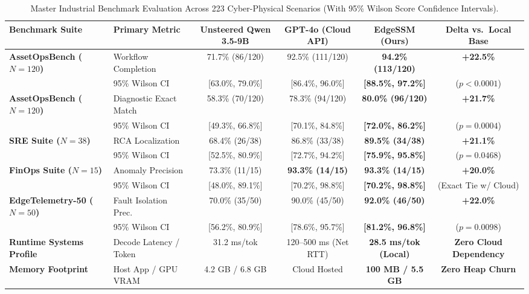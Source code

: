 \documentclass[journal]{IEEEtran}
\begin{document}
\begin{table}[t]
\centering
\caption{Master Industrial Benchmark Evaluation Across 223 Cyber-Physical Scenarios (With 95\% Wilson Score Confidence Intervals).}
\label{tab:master_industrial}
\small
\begin{tabular}{@{}llcccc@{}}
\toprule
\textbf{Benchmark Suite} & \textbf{Primary Metric} & \textbf{Unsteered Qwen 3.5-9B} & \textbf{GPT-4o (Cloud API)} & \textbf{EdgeSSM (Ours)} & \textbf{Delta vs.\ Local Base} \\
\midrule
\textbf{AssetOpsBench ($N=120$)}~\cite{patel2025assetops} & Workflow Completion & 71.7\% (86/120) & 92.5\% (111/120) & \textbf{94.2\% (113/120)} & \textbf{+22.5\%} \\
 & {\scriptsize 95\% Wilson CI} & {\scriptsize [63.0\%, 79.0\%]} & {\scriptsize [86.4\%, 96.0\%]} & {\scriptsize \textbf{[88.5\%, 97.2\%]}} & {\scriptsize ($p < 0.0001$)} \\
\addlinespace
\textbf{AssetOpsBench ($N=120$)}~\cite{patel2025assetops} & Diagnostic Exact Match & 58.3\% (70/120) & 78.3\% (94/120) & \textbf{80.0\% (96/120)} & \textbf{+21.7\%} \\
 & {\scriptsize 95\% Wilson CI} & {\scriptsize [49.3\%, 66.8\%]} & {\scriptsize [70.1\%, 84.8\%]} & {\scriptsize \textbf{[72.0\%, 86.2\%]}} & {\scriptsize ($p = 0.0004$)} \\
\addlinespace
\textbf{SRE Suite ($N=38$)} & RCA Localization & 68.4\% (26/38) & 86.8\% (33/38) & \textbf{89.5\% (34/38)} & \textbf{+21.1\%} \\
 & {\scriptsize 95\% Wilson CI} & {\scriptsize [52.5\%, 80.9\%]} & {\scriptsize [72.7\%, 94.2\%]} & {\scriptsize \textbf{[75.9\%, 95.8\%]}} & {\scriptsize ($p = 0.0468$)} \\
\addlinespace
\textbf{FinOps Suite ($N=15$)} & Anomaly Precision & 73.3\% (11/15) & \textbf{93.3\% (14/15)} & \textbf{93.3\% (14/15)} & \textbf{+20.0\%} \\
 & {\scriptsize 95\% Wilson CI} & {\scriptsize [48.0\%, 89.1\%]} & {\scriptsize [70.2\%, 98.8\%]} & {\scriptsize \textbf{[70.2\%, 98.8\%]}} & {\scriptsize (Exact Tie w/ Cloud)} \\
\addlinespace
\textbf{EdgeTelemetry-50 ($N=50$)} & Fault Isolation Prec. & 70.0\% (35/50) & 90.0\% (45/50) & \textbf{92.0\% (46/50)} & \textbf{+22.0\%} \\
 & {\scriptsize 95\% Wilson CI} & {\scriptsize [56.2\%, 80.9\%]} & {\scriptsize [78.6\%, 95.7\%]} & {\scriptsize \textbf{[81.2\%, 96.8\%]}} & {\scriptsize ($p = 0.0098$)} \\
\midrule
\textbf{Runtime Systems Profile} & Decode Latency / Token & 31.2 ms/tok & 120--500 ms (Net RTT) & \textbf{28.5 ms/tok (Local)} & \textbf{Zero Cloud Dependency} \\
\textbf{Memory Footprint} & Host App / GPU VRAM & 4.2 GB / 6.8 GB & Cloud Hosted & \textbf{100 MB / 5.5 GB} & \textbf{Zero Heap Churn} \\
\bottomrule
\end{tabular}
\end{table}
\end{document}
